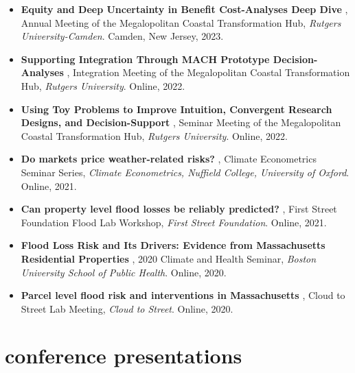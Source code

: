 \documentclass[10pt,oneside]{article}
\begin{document}
\begin{itemize}[label={}]
  \item

\textbf{Equity and Deep Uncertainty in Benefit Cost-Analyses Deep Dive}
, Annual Meeting of the Megalopolitan Coastal Transformation Hub, \textit{Rutgers University-Camden}. Camden, New Jersey, 2023.
  
  \item

\textbf{Supporting Integration Through MACH Prototype Decision-Analyses}
, Integration Meeting of the Megalopolitan Coastal Transformation Hub, \textit{Rutgers University}. Online, 2022.
  
  \item

\textbf{Using Toy Problems to Improve Intuition, Convergent Research Designs, and Decision-Support}
, Seminar Meeting of the Megalopolitan Coastal Transformation Hub, \textit{Rutgers University}. Online, 2022.
  
  \item

\textbf{Do markets price weather-related risks?}
, Climate Econometrics Seminar Series, \textit{Climate Econometrics, Nuffield College, University of Oxford}. Online, 2021.
  
  \item

\textbf{Can property level flood losses be reliably predicted?}
, First Street Foundation Flood Lab Workshop, \textit{First Street Foundation}. Online, 2021.
  
  \item

\textbf{Flood Loss Risk and Its Drivers: Evidence from Massachusetts Residential Properties}
, 2020 Climate and Health Seminar, \textit{Boston University School of Public Health}. Online, 2020.
  
  \item

\textbf{Parcel level flood risk and interventions in Massachusetts}
, Cloud to Street Lab Meeting, \textit{Cloud to Street}. Online, 2020.
  
\end{itemize}

\section{conference presentations}

\mbox{}\vspace{-\dimexpr\baselineskip\relax}
\vspace*{-1em}
\printbibliography[type=inproceedings, keyword={presentation}, heading=none]
\end{document}
